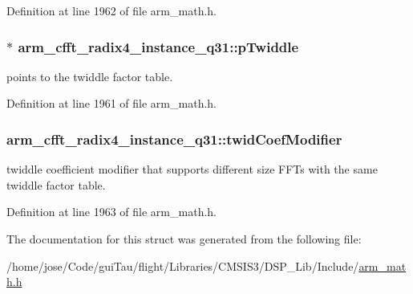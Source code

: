 Definition at line 1962 of file arm\-\_\-math.\-h.

\hypertarget{structarm__cfft__radix4__instance__q31_a561c22dee4cbdcfa0fd5f15106ecc306}{
\subsubsection[{p\-Twiddle}]{$\ast$ arm\-\_\-cfft\-\_\-radix4\-\_\-instance\-\_\-q31\-::p\-Twiddle}}\label{structarm__cfft__radix4__instance__q31_a561c22dee4cbdcfa0fd5f15106ecc306}
points to the twiddle factor table. 

Definition at line 1961 of file arm\-\_\-math.\-h.

\hypertarget{structarm__cfft__radix4__instance__q31_a8cf8187b8232815cf17ee82bf572ecf9}{
\subsubsection[{twid\-Coef\-Modifier}]{ arm\-\_\-cfft\-\_\-radix4\-\_\-instance\-\_\-q31\-::twid\-Coef\-Modifier}}\label{structarm__cfft__radix4__instance__q31_a8cf8187b8232815cf17ee82bf572ecf9}
twiddle coefficient modifier that supports different size F\-F\-Ts with the same twiddle factor table. 

Definition at line 1963 of file arm\-\_\-math.\-h.



The documentation for this struct was generated from the following file\-:\begin{DoxyCompactItemize}
\item 
/home/jose/\-Code/gui\-Tau/flight/\-Libraries/\-C\-M\-S\-I\-S3/\-D\-S\-P\-\_\-\-Lib/\-Include/\hyperlink{arm__math_8h}{arm\-\_\-math.\-h}\end{DoxyCompactItemize}
